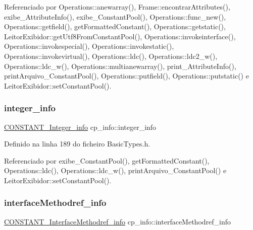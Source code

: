 Referenciado por Operations\+::anewarray(), Frame\+::encontrar\+Attributes(), exibe\+\_\+\+Attribute\+Info(), exibe\+\_\+\+Constant\+Pool(), Operations\+::func\+\_\+new(), Operations\+::getfield(), get\+Formatted\+Constant(), Operations\+::getstatic(), Leitor\+Exibidor\+::get\+Utf8\+From\+Constant\+Pool(), Operations\+::invokeinterface(), Operations\+::invokespecial(), Operations\+::invokestatic(), Operations\+::invokevirtual(), Operations\+::ldc(), Operations\+::ldc2\+\_\+w(), Operations\+::ldc\+\_\+w(), Operations\+::multianewarray(), print\+\_\+\+Attribute\+Info(), print\+Arquivo\+\_\+\+Constant\+Pool(), Operations\+::putfield(), Operations\+::putstatic() e Leitor\+Exibidor\+::set\+Constant\+Pool().

\mbox{\label{structcp__info_a134087258f855dca61e8e8922665d050}} 
\subsubsection{\texorpdfstring{integer\+\_\+info}{integer\_info}}
{\footnotesize\ttfamily \hyperlink{structCONSTANT__Integer__info}{C\+O\+N\+S\+T\+A\+N\+T\+\_\+\+Integer\+\_\+info} cp\+\_\+info\+::integer\+\_\+info}



Definido na linha 189 do ficheiro Basic\+Types.\+h.



Referenciado por exibe\+\_\+\+Constant\+Pool(), get\+Formatted\+Constant(), Operations\+::ldc(), Operations\+::ldc\+\_\+w(), print\+Arquivo\+\_\+\+Constant\+Pool() e Leitor\+Exibidor\+::set\+Constant\+Pool().

\mbox{\label{structcp__info_aaebedef650f8f22c5f66057bf1b1271a}} 
\subsubsection{\texorpdfstring{interface\+Methodref\+\_\+info}{interfaceMethodref\_info}}
{\footnotesize\ttfamily \hyperlink{structCONSTANT__InterfaceMethodref__info}{C\+O\+N\+S\+T\+A\+N\+T\+\_\+\+Interface\+Methodref\+\_\+info} cp\+\_\+info\+::interface\+Methodref\+\_\+info}




